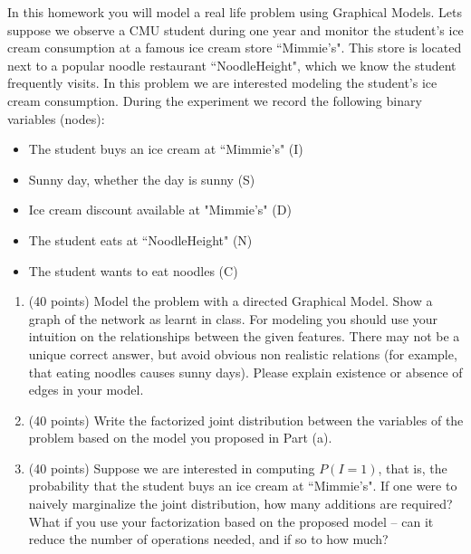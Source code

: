 \documentclass{article}
\begin{document}
In this homework you will model a real life problem using Graphical Models. Lets suppose we observe a CMU student during one year and monitor the student's ice cream consumption at a famous ice cream store ``Mimmie's". This store is located next to a popular noodle restaurant ``NoodleHeight", which we know the student frequently visits. In this problem we are interested modeling the student's ice cream consumption. During the experiment we record the following binary variables (nodes):

\begin{itemize}
    \item The student buys an ice cream at ``Mimmie's" (I)
    \item Sunny day, whether the day is sunny (S)
    \item Ice cream discount available at "Mimmie's" (D)
    \item The student eats at ``NoodleHeight" (N)
    \item The student wants to eat noodles (C)
\end{itemize}

\begin{enumerate}[a]
    \item (40 points) Model the problem with a directed Graphical Model. Show a graph of the network as learnt in class. For modeling you should use your intuition on the relationships between the given features. There may not be a unique correct answer, but avoid obvious non realistic relations (for example, that eating noodles causes sunny days). Please explain existence or absence of edges in your model.
    
    \item (40 points) Write the factorized joint distribution between the variables of the problem based on the model you proposed in Part (a).
    
    \item (40 points) Suppose we are interested in computing $P(I=1)$, that is, the probability that the student buys an ice cream at ``Mimmie's". If one were to naively marginalize the joint distribution, how many additions are required?  What if you use your factorization based on the proposed model -- can it reduce the number of operations needed, and if so to how much?
\end{enumerate}
\end{document}
